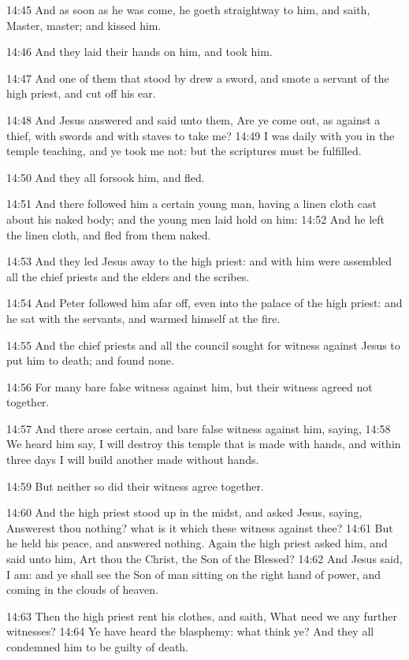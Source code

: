 14:45 And as soon as he was come, he goeth straightway to him, and saith, Master, master; and kissed him.

14:46 And they laid their hands on him, and took him.

14:47 And one of them that stood by drew a sword, and smote a servant of the high priest, and cut off his ear.

14:48 And Jesus answered and said unto them, Are ye come out, as against a thief, with swords and with staves to take me?  14:49 I was daily with you in the temple teaching, and ye took me not: but the scriptures must be fulfilled.

14:50 And they all forsook him, and fled.

14:51 And there followed him a certain young man, having a linen cloth cast about his naked body; and the young men laid hold on him: 14:52 And he left the linen cloth, and fled from them naked.

14:53 And they led Jesus away to the high priest: and with him were assembled all the chief priests and the elders and the scribes.

14:54 And Peter followed him afar off, even into the palace of the high priest: and he sat with the servants, and warmed himself at the fire.

14:55 And the chief priests and all the council sought for witness against Jesus to put him to death; and found none.

14:56 For many bare false witness against him, but their witness agreed not together.

14:57 And there arose certain, and bare false witness against him, saying, 14:58 We heard him say, I will destroy this temple that is made with hands, and within three days I will build another made without hands.

14:59 But neither so did their witness agree together.

14:60 And the high priest stood up in the midst, and asked Jesus, saying, Answerest thou nothing? what is it which these witness against thee?  14:61 But he held his peace, and answered nothing. Again the high priest asked him, and said unto him, Art thou the Christ, the Son of the Blessed?  14:62 And Jesus said, I am: and ye shall see the Son of man sitting on the right hand of power, and coming in the clouds of heaven.

14:63 Then the high priest rent his clothes, and saith, What need we any further witnesses?  14:64 Ye have heard the blasphemy: what think ye? And they all condemned him to be guilty of death.

